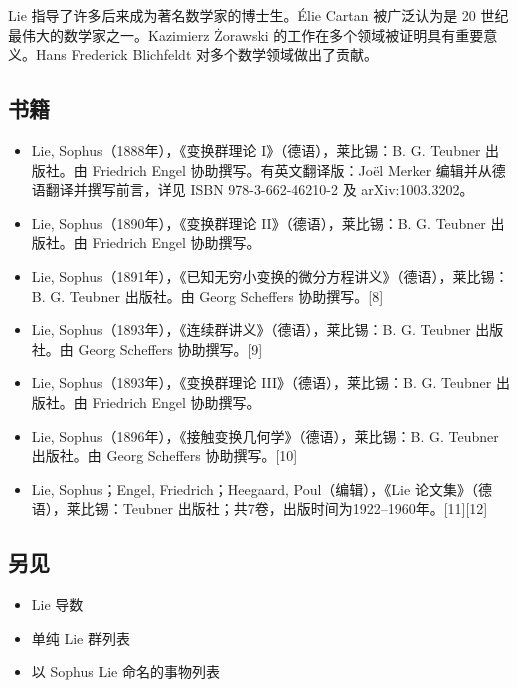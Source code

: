 Lie 指导了许多后来成为著名数学家的博士生。Élie Cartan 被广泛认为是 20 世纪最伟大的数学家之一。Kazimierz Żorawski 的工作在多个领域被证明具有重要意义。Hans Frederick Blichfeldt 对多个数学领域做出了贡献。
\subsection{书籍}
\begin{itemize}
\item Lie, Sophus（1888年），《变换群理论 I》（德语），莱比锡：B. G. Teubner 出版社。由 Friedrich Engel 协助撰写。有英文翻译版：Joël Merker 编辑并从德语翻译并撰写前言，详见 ISBN 978-3-662-46210-2 及 arXiv:1003.3202。
\item Lie, Sophus（1890年），《变换群理论 II》（德语），莱比锡：B. G. Teubner 出版社。由 Friedrich Engel 协助撰写。
\item Lie, Sophus（1891年），《已知无穷小变换的微分方程讲义》（德语），莱比锡：B. G. Teubner 出版社。由 Georg Scheffers 协助撰写。[8]
\item Lie, Sophus（1893年），《连续群讲义》（德语），莱比锡：B. G. Teubner 出版社。由 Georg Scheffers 协助撰写。[9]
\item Lie, Sophus（1893年），《变换群理论 III》（德语），莱比锡：B. G. Teubner 出版社。由 Friedrich Engel 协助撰写。
\item Lie, Sophus（1896年），《接触变换几何学》（德语），莱比锡：B. G. Teubner 出版社。由 Georg Scheffers 协助撰写。[10]
\item Lie, Sophus；Engel, Friedrich；Heegaard, Poul（编辑），《Lie 论文集》（德语），莱比锡：Teubner 出版社；共7卷，出版时间为1922–1960年。[11][12]
\end{itemize}
\subsection{另见}
\begin{itemize}
\item Lie 导数
\item 单纯 Lie 群列表
\item 以 Sophus Lie 命名的事物列表
\end{itemize}
